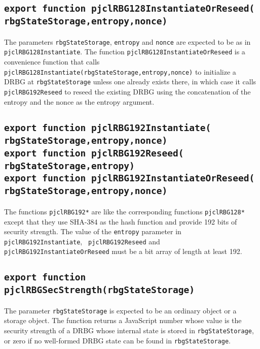 \documentclass[12pt]{article}
\begin{document}
\subsection{\tt export function pjclRBG128InstantiateOrReseed(\\\mbox{}\hspace{.2in}rbgStateStorage,entropy,nonce)}

The parameters {\tt rbgStateStorage}, {\tt entropy} and {\tt nonce}
are expected to be as in\\
{\tt pjclRBG128Instantiate}.
The function {\tt pjclRBG128InstantiateOrReseed} is a convenience 
function that calls {\tt pjclRBG128Instantiate(rbgStateStorage,entropy,nonce)}
to initialize a DRBG at {\tt rbgStateStorage} unless one already
exists there, in which case it calls {\tt pjclRBG192Reseed}
to reseed the existing DRBG using the concatenation of the entropy
and the nonce as the entropy argument.

\subsection{\tt export function pjclRBG192Instantiate(\\\mbox{}\hspace{.2in}rbgStateStorage,entropy,nonce)\\export function pjclRBG192Reseed(\\\mbox{}\hspace{.2in}rbgStateStorage,entropy)\\export function pjclRBG192InstantiateOrReseed(\\\mbox{}\hspace{.2in}rbgStateStorage,entropy,nonce)}

The functions {\tt pjclRBG192*} are like the corresponding functions {\tt pjclRBG128*}
except that they use SHA-384 as the hash function
and provide 192 bits of security strength.  The value of
the {\tt entropy} parameter in {\tt pjclRBG192Instantiate}, {\tt
  pjclRBG192Reseed} and\\
{\tt pjclRBG192InstantiateOrReseed} must be a
bit array of length at least 192.

\subsection{\tt export function pjclRBGSecStrength(rbgStateStorage)}

The parameter {\tt rbgStateStorage} is expected to be an ordinary
object or a storage object.  The function
returns a JavaScript number whose value is the security strength
of a DRBG whose internal state is stored in {\tt rbgStateStorage},
or zero if no well-formed DRBG state can be found in {\tt rbgStateStorage}.
\end{document}
